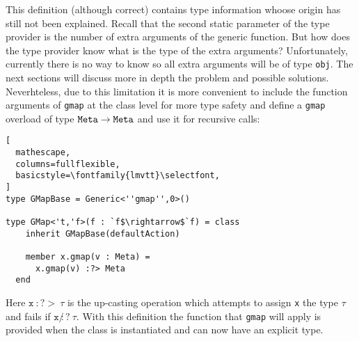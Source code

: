 \documentclass{sigplanconf}
\begin{document}
This definition (although correct) contains type information whoose
origin has still not been explained. Recall that the second static
parameter of the type provider is the number of extra arguments of the
generic function. But how does the type provider know what is the type
of the extra arguments? Unfortunately, currently there is no way to
know so all extra arguments will be of type \verb+obj+. The next
sections will discuss more in depth the problem and possible
solutions. Neverhteless, due to this limitation it is more convenient
to include the function arguments of \verb+gmap+ at the class level
for more type safety and define a \verb+gmap+ overload of type
$\mathtt{Meta}\rightarrow\mathtt{Meta}$ and use it for recursive calls:
\begin{lstlisting}[
  mathescape,
  columns=fullflexible,
  basicstyle=\fontfamily{lmvtt}\selectfont,
]
type GMapBase = Generic<''gmap'',0>()

type GMap<'t,'f>(f : `f$\rightarrow$`f) = class
    inherit GMapBase(defaultAction)

    member x.gmap(v : Meta) =
      x.gmap(v) :?> Meta
  end
\end{lstlisting}
Here $\mathtt{x}\ :?>\ \tau$ is the up-casting operation which
attempts to assign \verb+x+ the type $\tau$ and fails if $\mathtt{x}\
\not:?\ \tau$. With this definition the function that \verb+gmap+ will
apply is provided when the class is instantiated and can now have an
explicit type.
\end{document}
